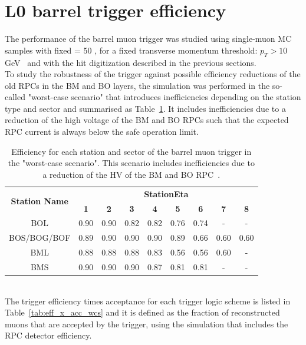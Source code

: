 \section{L0 barrel trigger efficiency}
\label{sec:eff}
The performance of the barrel muon trigger was studied using single-muon MC samples with fixed \pT = 50 \GeV, for a fixed transverse momentum threshold: $p_{T} > 10$ GeV~\cite{Marcoccia:2693982} and with the hit digitization described in the previous sections.\\
To study the robustness of the trigger against possible efficiency reductions of the old RPCs in the BM and BO layers, the simulation was performed in the so-called "worst-case scenario" that introduces inefficiencies depending on the station type and sector and summarised as Table~\ref{tab:WCS}. It includes inefficiencies due to a reduction of the high voltage of the BM and BO RPCs such that the expected RPC current is always below the safe operation limit.
\begin{table}[!htbp]
	\begin{center}
		\begin{tabular}{c|cccccccc}
			\multirow{2}{*}{\textbf{Station Name}} & \multicolumn{8}{c}{\textbf{StationEta}}\\
			\cline{2-9}
			& \textbf{1} & \textbf{2} & \textbf{3} & \textbf{4} & \textbf{5} & \textbf{6} & \textbf{7} & \textbf{8}\\
			\hline 
			BOL                 				   & 0.90  	    & 0.90		 & 0.82 	  & 0.82 	   & 0.76 		& 0.74 		 & -	      & -    \\
			BOS/BOG/BOF 						   & 0.89 		& 0.90 		 & 0.90 	  & 0.90	   & 0.89 		& 0.66 		 & 0.60       & 0.60 \\
			BML                					   & 0.88		& 0.88 		 & 0.88 	  & 0.83 	   & 0.56 		& 0.56		 & 0.60       & -    \\
			BMS              					   & 0.90  	    & 0.90		 & 0.90 	  & 0.87 	   & 0.81 	    & 0.81    	 & -          & -    \\
			\hline 
		\end{tabular} 
		\caption{Efficiency for each station and sector of the barrel muon trigger in the "worst-case scenario". This scenario includes inefficiencies due to a reduction of the HV of the BM and BO RPC~\cite{Marcoccia:2693982}.} 
		\label{tab:WCS}
	\end{center} 
\end{table} 
\\The trigger efficiency times acceptance for each trigger logic scheme is listed in Table~\ref{tab:eff_x_acc_wcs} and it is defined as the fraction of reconstructed muons that are accepted by the trigger, using the simulation that includes the RPC detector efficiency.
